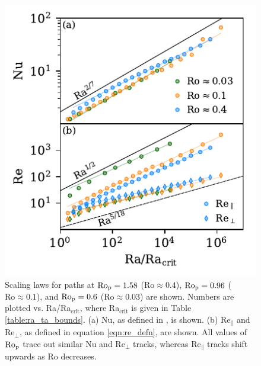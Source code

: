 \begin{figure}[p!]
    \includegraphics[width=\textwidth]{./figs/nu_and_re.pdf}
    \caption[Scaling of Nusselt and Reynolds numbers on fixed Predictive Rossby paths.]
	{
	Scaling laws for paths at $\text{Ro}_{\text{p}} = 1.58$ ($\text{Ro} \approx 0.4$),
    $\text{Ro}_{\text{p}} = 0.96$ ($\text{Ro} \approx 0.1$), and $\text{Ro}_{\text{p}} = 0.6$ ($\text{Ro} \approx 0.03$) are shown. 
    Numbers are plotted vs. Ra/Ra$_{\text{crit}}$, where Ra$_{\text{crit}}$ is given in Table \ref{table:ra_ta_bounds}.
	(a) Nu, as defined in \AB, is shown.
    (b) $\text{Re}_\parallel$ and $\text{Re}_{\perp}$, as defined in equation \ref{eqn:re_defn},
	are shown. All values of $\text{Ro}_{\text{p}}$ trace out similar Nu and $\text{Re}_{\perp}$ tracks,
	whereas $\text{Re}_\parallel$ tracks shift upwards as Ro decreases.
    \label{fig:nu_and_re} }
\end{figure}

